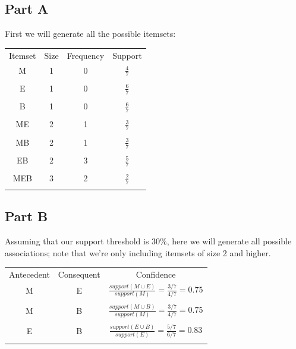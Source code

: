 \documentclass{article}
\begin{document}
\subsection*{Part A}

First we will generate all the possible itemsets:

\begin{center}
    \begin{tabular}{c c c c}
        Itemset & Size & Frequency & Support \\
        M & 1 & 0 & $\frac{4}{7}$\\\\
        E & 1 & 0 & $\frac{6}{7}$\\\\
        B & 1 & 0 & $\frac{6}{7}$\\\\
        ME & 2 & 1 & $\frac{3}{7}$\\\\
        MB & 2 & 1 & $\frac{3}{7}$\\\\
        EB & 2 & 3 & $\frac{5}{7}$\\\\
        MEB & 3 & 2 & $\frac{2}{7}$\\\\
    \end{tabular}
\end{center}

\subsection*{Part B}

Assuming that our support threshold is $30\%$, here we will generate all possible associations; note that we're only including itemsets of size 2 and higher.

\begin{center}
    \begin{tabular}{c c c}
        Antecedent & Consequent & Confidence \\
        M & E & $\frac{support(M \cup E)}{support(M)} = \frac{3/7}{4/7} = 0.75$ \\\\
        M & B & $\frac{support(M \cup B)}{support(M)} = \frac{3/7}{4/7} = 0.75$ \\\\
        E & B & $\frac{support(E \cup B)}{support(E)} = \frac{5/7}{6/7} = 0.83$ \\\\
    \end{tabular}
\end{center}
\end{document}
